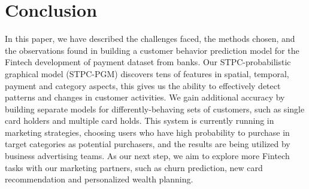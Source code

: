 \documentclass[sigconf]{acmart}
\begin{document}
\section{Conclusion}
In this paper, we have described the challenges faced, the methods chosen, and the observations found in building a customer behavior prediction model for the Fintech development of payment dataset from banks. Our STPC-probabilistic graphical model (STPC-PGM) discovers tens of features in spatial, temporal, payment and category aspects, this gives us the ability to effectively detect patterns and changes in customer activities. 
We gain additional accuracy by building separate models for differently-behaving sets of customers, such as
single card holders and multiple card holds. 
This system is currently running in marketing strategies, choosing users who have high probability to purchase in target categories as potential purchasers, and the results are being utilized by business advertising teams.
As our next step, we aim to explore more Fintech tasks with our marketing partners, such as churn prediction, new card recommendation and personalized wealth planning.



\end{document}
